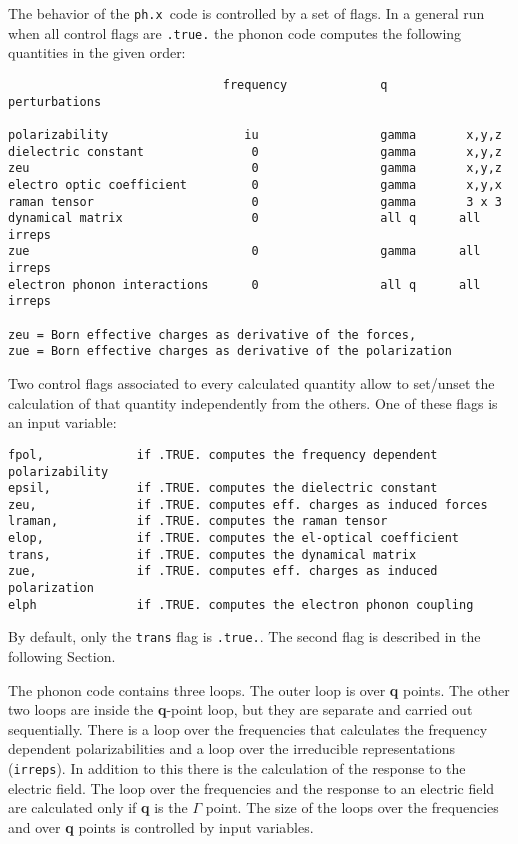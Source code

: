 \documentclass[12pt,a4paper]{article}
\def\phx{\texttt{ph.x}}
\begin{document}
The behavior of the \phx\ code is controlled by a set of flags.
In a general run when all control flags are \texttt{.true.} the phonon 
code computes the following quantities in the given order:

\begin{verbatim}
                              frequency             q        perturbations

polarizability                   iu                 gamma       x,y,z 
dielectric constant               0                 gamma       x,y,z
zeu                               0                 gamma       x,y,z  
electro optic coefficient         0                 gamma       x,y,x 
raman tensor                      0                 gamma       3 x 3
dynamical matrix                  0                 all q      all irreps
zue                               0                 gamma      all irreps
electron phonon interactions      0                 all q      all irreps

zeu = Born effective charges as derivative of the forces,
zue = Born effective charges as derivative of the polarization 
\end{verbatim}

Two control flags associated to every calculated quantity 
allow to set/unset the calculation of that quantity independently from 
the others. One of these flags is an input variable:

\begin{verbatim}
fpol,             if .TRUE. computes the frequency dependent polarizability
epsil,            if .TRUE. computes the dielectric constant
zeu,              if .TRUE. computes eff. charges as induced forces
lraman,           if .TRUE. computes the raman tensor
elop,             if .TRUE. computes the el-optical coefficient
trans,            if .TRUE. computes the dynamical matrix
zue,              if .TRUE. computes eff. charges as induced polarization
elph              if .TRUE. computes the electron phonon coupling
\end{verbatim}

By default, only the \texttt{trans} flag is \texttt{.true.}.
The second flag is described in the following Section.

The phonon code contains three loops.
The outer loop is over {\bf q} points. The other two loops are inside the
{\bf q}-point loop, but they are separate and carried out sequentially. 
There is a loop over the frequencies that calculates the frequency 
dependent polarizabilities and a loop over the irreducible 
representations (\texttt{irreps}). 
In addition to this there is the calculation of the response to the electric
field. The loop over the frequencies and the response to an electric field are 
calculated only if {\bf q} is the $\Gamma$ point. The size of the loops over
the frequencies and over {\bf q} points is controlled by input variables.  
\end{document}
